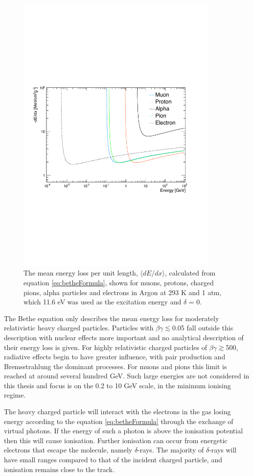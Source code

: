 \begin{figure}
\begin{center}
\includegraphics[width=100mm]{Chapter1/figures/energyLossInArgon.pdf}
\caption{The mean energy loss per unit length, $\langle dE/dx \rangle$, calculated from equation \ref{eq:betheFormula}, shown for muons, protons, charged pions, alpha particles and electrons in Argon at 293 K and 1 atm, which 11.6 eV was used as the excitation energy and $\delta$ = 0. }
\label{fig:betheEnergyLoss}
\end{center}
\end{figure}
The Bethe equation only describes the mean energy loss for moderately relativistic heavy charged particles. Particles with $\beta\gamma\lesssim$0.05 fall outside this description with nuclear effects more important and no analytical description of their energy loss is given. For highly relativistic charged particles of $\beta\gamma\gtrsim$500, radiative effects begin to have greater influence, with pair production and Bremsstrahlung the dominant processes. For muons and pions this limit is reached at around several hundred GeV. Such large energies are not considered in this thesis and focus is on the 0.2 to 10 GeV scale, in the minimum ionising regime. 

The heavy charged particle will interact with the electrons in the gas losing energy according to the equation \ref{eq:betheFormula} through the exchange of virtual photons. If the energy of such a photon is above the ionisation potential then this will cause ionisation. Further ionisation can occur from energetic electrons that escape the molecule, namely $\delta$-rays. The majority of $\delta$-rays will have small ranges compared to that of the incident charged particle, and ionisation remains close to the track.

